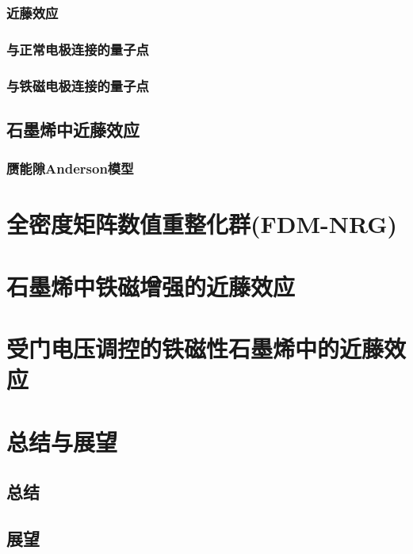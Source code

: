 \documentclass[twoside]{LZUthesis}
\begin{document}
\subsection{近藤效应}
\subsection{与正常电极连接的量子点}
\subsection{与铁磁电极连接的量子点}
\section{石墨烯中近藤效应}
\subsection{赝能隙Anderson模型}

\chapter{全密度矩阵数值重整化群(FDM-NRG)}

\chapter{石墨烯中铁磁增强的近藤效应}


\chapter{受门电压调控的铁磁性石墨烯中的近藤效应}


\chapter{总结与展望}

\section{总结}
\section{展望}




%
%

\end{document}

